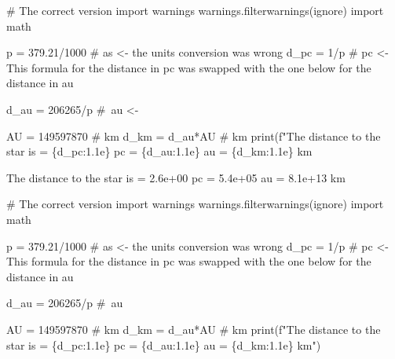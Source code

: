 \documentclass[
  letterpaper,
  DIV=11,
  numbers=noendperiod]{scrreprt}
\newenvironment{Shaded}{\begin{snugshade}}{\end{snugshade}}
\newcommand{\BuiltInTok}[1]{\textcolor[rgb]{0.00,0.23,0.31}{#1}}
\newcommand{\CommentTok}[1]{\textcolor[rgb]{0.37,0.37,0.37}{#1}}
\newcommand{\DecValTok}[1]{\textcolor[rgb]{0.68,0.00,0.00}{#1}}
\newcommand{\FloatTok}[1]{\textcolor[rgb]{0.68,0.00,0.00}{#1}}
\newcommand{\ImportTok}[1]{\textcolor[rgb]{0.00,0.46,0.62}{#1}}
\newcommand{\NormalTok}[1]{\textcolor[rgb]{0.00,0.23,0.31}{#1}}
\newcommand{\OperatorTok}[1]{\textcolor[rgb]{0.37,0.37,0.37}{#1}}
\newcommand{\SpecialCharTok}[1]{\textcolor[rgb]{0.37,0.37,0.37}{#1}}
\newcommand{\SpecialStringTok}[1]{\textcolor[rgb]{0.13,0.47,0.30}{#1}}
\newcommand{\StringTok}[1]{\textcolor[rgb]{0.13,0.47,0.30}{#1}}
\begin{document}
\begin{Shaded}
\begin{Highlighting}[]
\CommentTok{\# The correct version}
\ImportTok{import}\NormalTok{ warnings}
\NormalTok{warnings.filterwarnings(}\StringTok{\textquotesingle{}ignore\textquotesingle{}}\NormalTok{)}
\ImportTok{import}\NormalTok{ math}

\NormalTok{p }\OperatorTok{=} \FloatTok{379.21}\OperatorTok{/}\DecValTok{1000} \CommentTok{\# as \textless{}{-} the units conversion was wrong}
\NormalTok{d\_pc }\OperatorTok{=} \DecValTok{1}\OperatorTok{/}\NormalTok{p }\CommentTok{\# pc \textless{}{-} This formula for the distance in pc was swapped with the one below for the distance in au}

\NormalTok{d\_au }\OperatorTok{=} \DecValTok{206265}\OperatorTok{/}\NormalTok{p }\CommentTok{\# au \textless{}{-}}

\NormalTok{AU }\OperatorTok{=} \DecValTok{149597870} \CommentTok{\# km}
\NormalTok{d\_km }\OperatorTok{=}\NormalTok{ d\_au}\OperatorTok{*}\NormalTok{AU }\CommentTok{\# km}
\BuiltInTok{print}\NormalTok{(}\SpecialStringTok{f"The distance to the star is = }\SpecialCharTok{\{}\NormalTok{d\_pc}\SpecialCharTok{:1.1e\}}\SpecialStringTok{ pc = }\SpecialCharTok{\{}\NormalTok{d\_au}\SpecialCharTok{:1.1e\}}\SpecialStringTok{ au = }\SpecialCharTok{\{}\NormalTok{d\_km}\SpecialCharTok{:1.1e\}}\SpecialStringTok{ km}
\end{Highlighting}
\end{Shaded}

The distance to the star is = 2.6e+00 pc = 5.4e+05 au = 8.1e+13 km

\begin{Shaded}
\begin{Highlighting}[]
\CommentTok{\# The correct version}
\ImportTok{import}\NormalTok{ warnings}
\NormalTok{warnings.filterwarnings(}\StringTok{\textquotesingle{}ignore\textquotesingle{}}\NormalTok{)}
\ImportTok{import}\NormalTok{ math}

\NormalTok{p }\OperatorTok{=} \FloatTok{379.21}\OperatorTok{/}\DecValTok{1000} \CommentTok{\# as \textless{}{-} the units conversion was wrong}
\NormalTok{d\_pc }\OperatorTok{=} \DecValTok{1}\OperatorTok{/}\NormalTok{p }\CommentTok{\# pc \textless{}{-} This formula for the distance in pc was swapped with the one below for the distance in au}

\NormalTok{d\_au }\OperatorTok{=} \DecValTok{206265}\OperatorTok{/}\NormalTok{p }\CommentTok{\# au}

\NormalTok{AU }\OperatorTok{=} \DecValTok{149597870} \CommentTok{\# km}
\NormalTok{d\_km }\OperatorTok{=}\NormalTok{ d\_au}\OperatorTok{*}\NormalTok{AU }\CommentTok{\# km}
\BuiltInTok{print}\NormalTok{(}\SpecialStringTok{f"The distance to the star is = }\SpecialCharTok{\{}\NormalTok{d\_pc}\SpecialCharTok{:1.1e\}}\SpecialStringTok{ pc = }\SpecialCharTok{\{}\NormalTok{d\_au}\SpecialCharTok{:1.1e\}}\SpecialStringTok{ au = }\SpecialCharTok{\{}\NormalTok{d\_km}\SpecialCharTok{:1.1e\}}\SpecialStringTok{ km"}\NormalTok{)}
\end{Highlighting}
\end{Shaded}
\end{document}
